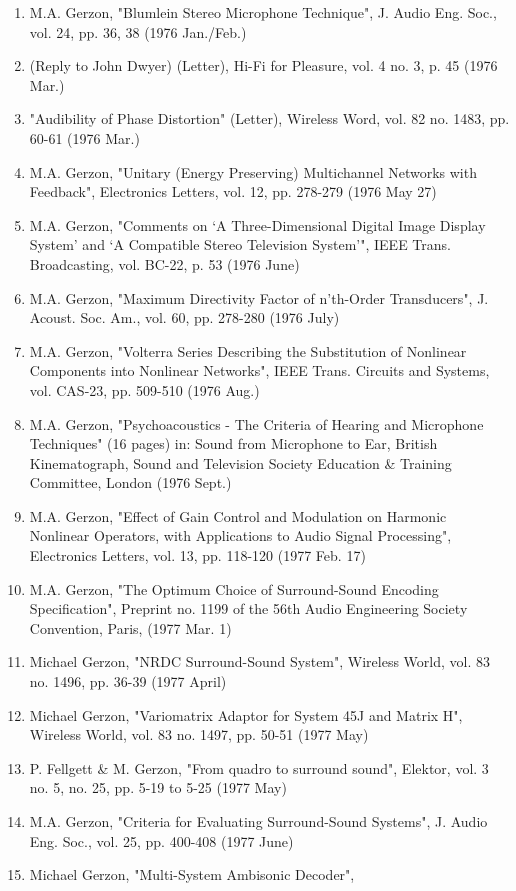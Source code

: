 \documentclass[9pt]{amsart}
\begin{document}
\begin{enumerate}
\item M.A. Gerzon, "Blumlein Stereo Microphone Technique", J. Audio Eng. Soc., vol. 24, pp. 36, 38 (1976 Jan./Feb.)
\item (Reply to John Dwyer) (Letter), Hi-Fi for Pleasure, vol. 4 no. 3, p. 45 (1976 Mar.)
\item "Audibility of Phase Distortion" (Letter), Wireless Word, vol. 82 no. 1483, pp. 60-61 (1976 Mar.)
\item M.A. Gerzon, "Unitary (Energy Preserving) Multichannel Networks with Feedback", Electronics Letters, vol. 12, pp. 278-279 (1976 May 27)
\item M.A. Gerzon, "Comments on `A Three-Dimensional Digital Image Display System' and `A Compatible Stereo Television System'", IEEE Trans. Broadcasting, vol. BC-22, p. 53 (1976 June)
\item M.A. Gerzon, "Maximum Directivity Factor of n'th-Order Transducers", J. Acoust. Soc. Am., vol. 60, pp. 278-280 (1976 July)
\item M.A. Gerzon, "Volterra Series Describing the Substitution of Nonlinear Components into Nonlinear Networks", IEEE Trans. Circuits and Systems, vol. CAS-23, pp. 509-510 (1976 Aug.)
\item M.A. Gerzon, "Psychoacoustics - The Criteria of Hearing and Microphone Techniques" (16 pages) in: Sound from Microphone to Ear, British Kinematograph, Sound and Television Society Education \& Training Committee, London (1976 Sept.)
\item M.A. Gerzon, "Effect of Gain Control and Modulation on Harmonic Nonlinear Operators, with Applications to Audio Signal Processing", Electronics Letters, vol. 13, pp. 118-120 (1977 Feb. 17)
\item M.A. Gerzon, "The Optimum Choice of Surround-Sound Encoding Specification", Preprint no. 1199 of the 56th Audio Engineering Society Convention, Paris, (1977 Mar. 1)
\item Michael Gerzon, "NRDC Surround-Sound System", Wireless World, vol. 83 no. 1496, pp. 36-39 (1977 April)
\item Michael Gerzon, "Variomatrix Adaptor for System 45J and Matrix H", Wireless World, vol. 83 no. 1497, pp. 50-51 (1977 May)
\item P. Fellgett \& M. Gerzon, "From quadro to surround sound", Elektor, vol. 3 no. 5, no. 25, pp. 5-19 to 5-25 (1977 May)
\item M.A. Gerzon, "Criteria for Evaluating Surround-Sound Systems", J. Audio Eng. Soc., vol. 25, pp. 400-408 (1977 June)
\item Michael Gerzon, "Multi-System Ambisonic Decoder",

\end{enumerate}
\end{document}
